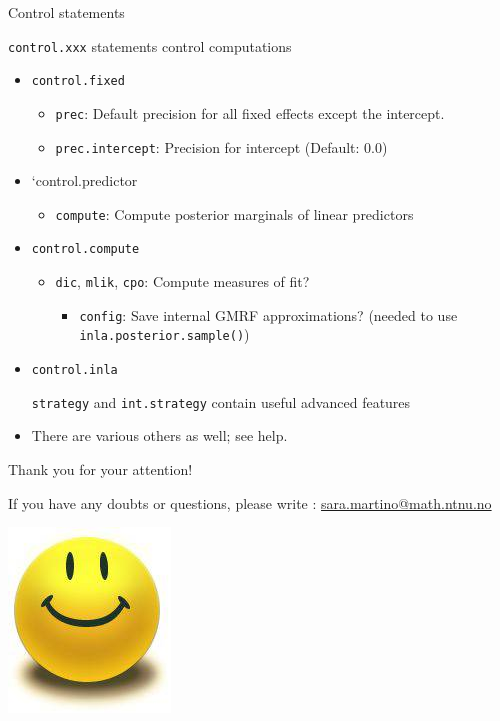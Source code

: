 \documentclass[
  ignorenonframetext,
]{beamer}
\providecommand{\tightlist}{%
  \setlength{\itemsep}{0pt}\setlength{\parskip}{0pt}}
\begin{document}
\begin{frame}[fragile]{Control statements}
\protect\hypertarget{control-statements-1}{}
\small

\texttt{control.xxx} statements control computations

\begin{itemize}
\item
  \texttt{control.fixed}

  \begin{itemize}
  \tightlist
  \item
    \texttt{prec}: Default precision for all fixed effects except the
    intercept.
  \item
    \texttt{prec.intercept}: Precision for intercept (Default: 0.0)
  \end{itemize}
\item
  `control.predictor

  \begin{itemize}
  \tightlist
  \item
    \texttt{compute}: Compute posterior marginals of linear predictors
  \end{itemize}
\item
  \texttt{control.compute}

  \begin{itemize}
  \item
    \texttt{dic}, \texttt{mlik}, \texttt{cpo}: Compute measures of fit?

    \begin{itemize}
    \tightlist
    \item
      \texttt{config}: Save internal GMRF approximations? (needed to use
      \texttt{inla.posterior.sample()})
    \end{itemize}
  \end{itemize}
\item
  \texttt{control.inla}

  \texttt{strategy} and \texttt{int.strategy} contain useful advanced
  features
\item
  There are various others as well; see help.
\end{itemize}

\normalsize
\end{frame}

\begin{frame}{}
\protect\hypertarget{section-10}{}
\Large

Thank you for your attention!

\normalsize

If you have any doubts or questions, please write :
\url{sara.martino@math.ntnu.no}

\begin{center}\includegraphics[width=0.3\linewidth]{graphics/smiley_small} \end{center}
\end{frame}
\end{document}
